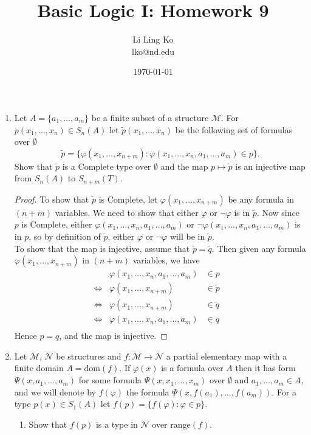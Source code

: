 \documentclass{article}
\begin{document}
\title{Basic Logic I: Homework 9}
\author{Li Ling Ko\\ lko@nd.edu}
\date{\today}
\maketitle

\begin{enumerate}[label={\bf Q\arabic*:}]
  \item Let $A=\{a_1,\ldots,a_m\}$ be a finite subset of a structure
    $\mathcal{M}$. For $p(x_1,\ldots,x_n)\in S_n(A)$ let
    $\tilde{p}(x_1,\ldots,x_n)$ be the following set of formulas over
    $\emptyset$
    \[\tilde{p}=\{\varphi(x_1,\ldots,x_{n+m}):
    \varphi(x_1,\ldots,x_n,a_1,\ldots,a_m)\in p\}.\]
    Show that $\tilde{p}$ is a Complete type over $\emptyset$ and the
    map $p\mapsto\tilde{p}$ is an injective map from $S_n(A)$ to
    $S_{n+m}(T)$.

    \begin{proof}
      To show that $\tilde{p}$ is Complete, let
      $\varphi(x_1,\ldots,x_{n+m})$ be any formula in $(n+m)$ variables. We
      need to show that either $\varphi$ or $\neg\varphi$ is in
      $\tilde{p}$. Now since $p$ is Complete, either
      $\varphi(x_1,\ldots,x_n,a_1,\ldots,a_m)$ or
      $\neg\varphi(x_1,\ldots,x_n,a_1,\ldots,a_m)$ is in $p$, so by
      definition of $\tilde{p}$, either $\varphi$ or $\neg\varphi$ will be
      in $\tilde{p}$. \\

      To show that the map is injective, assume that $\tilde{p}=\tilde{q}$.
      Then given any formula $\varphi(x_1,\ldots,x_{n+m})$ in $(n+m)$
      variables, we have
      \begin{align*}
                        & \varphi(x_1,\ldots,x_n,a_1,\ldots,a_m) &\in p & \\
        \Leftrightarrow & \varphi(x_1,\ldots,x_{n+m}) &\in \tilde{p} & \\
        \Leftrightarrow & \varphi(x_1,\ldots,x_{n+m}) &\in \tilde{q} & \\
        \Leftrightarrow & \varphi(x_1,\ldots,x_n,a_1,\ldots,a_m) &\in q & \\
      \end{align*}
      Hence $p=q$, and the map is injective.
    \end{proof}

  \item Let $\mathcal{M}$, $\mathcal{N}$ be structures and
    $f:\mathcal{M}\rightarrow\mathcal{N}$ a partial elementary map with a
    finite domain $A=\text{dom}(f)$. If $\varphi(x)$ is a formula over $A$
    then it has form $\Psi(x,a_1,\ldots,a_m)$ for some formula
    $\Psi(x,x_1,\ldots,x_m)$ over $\emptyset$ and $a_1,\ldots,a_m \in A$,
    and we will denote by $f(\varphi)$ the formula
    $\Psi(x,f(a_1),\ldots,f(a_m))$. For a type $p(x)\in S_1(A)$ let
    $f(p)=\{f(\varphi):\varphi\in p\}$.
    \begin{enumerate}
      \item Show that $f(p)$ is a type in $\mathcal{N}$ over
        $\text{range}(f)$.


\end{enumerate}
\end{enumerate}
\end{document}
